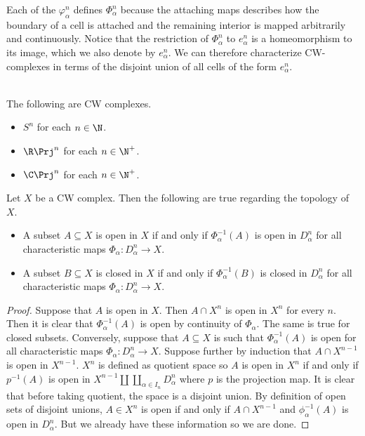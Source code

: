 \documentclass[a4paper]{article}
\begin{document}
Each of the $\varphi_\alpha^n$ defines $\Phi_\alpha^n$ because the attaching maps describes how the boundary of a cell is attached and the remaining interior is mapped arbitrarily and continuously. Notice that the restriction of $\Phi_\alpha^n$ to $e_\alpha^n$ is a homeomorphism to its image, which we also denote by $e_\alpha^n$. We can therefore characterize CW-complexes in terms of the disjoint union of all cells of the form $e_\alpha^n$. 

\begin{eg}{}{}\\
The following are CW complexes. 
\begin{itemize}
\item $S^n$ for each $n\in\N$. 
\item $\R\Prj^n$ for each $n\in\N^+$. 
\item $\C\Prj^n$ for each $n\in\N^+$. 
\end{itemize}
\end{eg}

\begin{prp}{}{} Let $X$ be a CW complex. Then the following are true regarding the topology of $X$. 
\begin{itemize}
\item A subset $A\subseteq X$ is open in $X$ if and only if $\Phi_\alpha^{-1}(A)$ is open in $D_\alpha^n$ for all characteristic maps $\Phi_\alpha:D_\alpha^n\to X$. 
\item A subset $B\subseteq X$ is closed in $X$ if and only if $\Phi_\alpha^{-1}(B)$ is closed in $D_\alpha^n$ for all characteristic maps $\Phi_\alpha:D_\alpha^n\to X$. 
\end{itemize} 
\begin{proof}
Suppose that $A$ is open in $X$. Then $A\cap X^n$ is open in $X^n$ for every $n$. Then it is clear that $\Phi_\alpha^{-1}(A)$ is open by continuity of $\Phi_\alpha$. The same is true for closed subsets. Conversely, suppose that $A\subseteq X$ is such that $\Phi_\alpha^{-1}(A)$ is open for all characteristic maps $\Phi_\alpha:D_\alpha^n\to X$. Suppose further by induction that $A\cap X^{n-1}$ is open in $X^{n-1}$. $X^n$ is defined as quotient space so $A$ is open in $X^n$ if and only if $p^{-1}(A)$ is open in $X^{n-1}\amalg\coprod_{\alpha\in I_n}D_\alpha^n$ where $p$ is the projection map. It is clear that before taking quotient, the space is a disjoint union. By definition of open sets of disjoint unions, $A\in X^n$ is open if and only if $A\cap X^{n-1}$ and $\phi_\alpha^{-1}(A)$ is open in $D_\alpha^n$. But we already have these information so we are done. 
\end{proof}
\end{prp}
\end{document}
